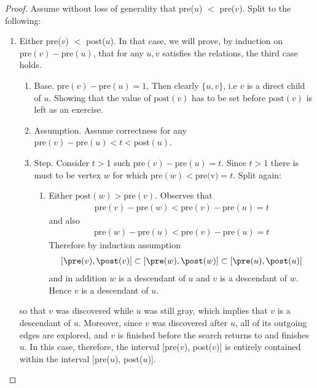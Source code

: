   \begin{proof} 
      Assume without loss of generality that pre($u$) $<$ pre($v$). Split to the following:
	\begin{enumerate}
	  \item Either pre($v$) $<$ post($u$). In that case, we will prove, by induction on $\text{pre}(v)-\text{pre}(u)$, that for any $u,v$ satisfies the relations, the third case holds. 
	    \begin{enumerate}
	      \item Base. $\text{pre}(v)-\text{pre}(u) = 1$, Then clearly $\{u,v\}$, i.e $v$ is a direct child of $u$. Showing that the value of $\text{post}(v)$ has to be set before  $\text{post}(v)$ is left as an exercise. 
	      \item Assumption. Assume correctness for any $\text{pre}(v)-\text{pre}(u) < t < \text{post}(u)$.
	      \item Step. Consider $t > 1$ such  $\text{pre}(v)-\text{pre}(u) = t$. Since $t > 1$ there is must to be vertex $w$ for which $\text{pre}(w) < \text{pre(v)} = t$. Split again:  
		\begin{enumerate}
		  \item Either $\text{post}(w) > \text{pre}(v)$. Observes that \begin{equation*}
		      \begin{split}
\text{pre}(v) - \text{pre}(w) < \text{pre}(v) - \text{pre}(u) = t
		      \end{split}
		    \end{equation*}
		     and also  
		     \begin{equation*}
		       \begin{split}
\text{pre}(w) - \text{pre}(u) < \text{pre}(v) - \text{pre}(u) = t
		       \end{split}
		     \end{equation*}
		      Therefore by induction assumption 
		      \begin{equation*}
			\begin{split}
[\pre(v),\post(v)] \subset [\pre(w),\post(w)]\subset [\pre(u),\post(u)]
			\end{split}
		      \end{equation*}
		      and in addition $w$ is a descendant of $u$ and $v$ is a descendant of $w$. Hence $v$ is a descendant of $u$.  
		\end{enumerate}
	    \end{enumerate}
	    so that $v$ was discovered while $u$ was still gray, which implies that $v$ is a descendant of $u$. Moreover, since $v$ was discovered after $u$, all of its outgoing edges are explored, and $v$ is finished before the search returns to and finishes $u$. In this case, therefore, the interval [pre($v$), post($v$)] is entirely contained within the interval [pre($u$), post($u$)].

\end{enumerate}
\end{proof}

